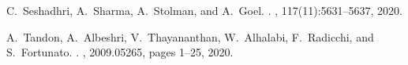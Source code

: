 \documentclass[12pt]{jarticle}
\begin{document}
\begin{thebibliography}{10}
C.~Seshadhri, A.~Sharma, A.~Stolman, and A.~Goel.
. 
, 117(11):5631--5637, 2020.

A.~Tandon, A.~Albeshri, V.~Thayananthan, W.~Alhalabi, F.~Radicchi, and S.~Fortunato.
.
, 2009.05265, pages 1--25, 2020.

\end{thebibliography}




\end{document}
